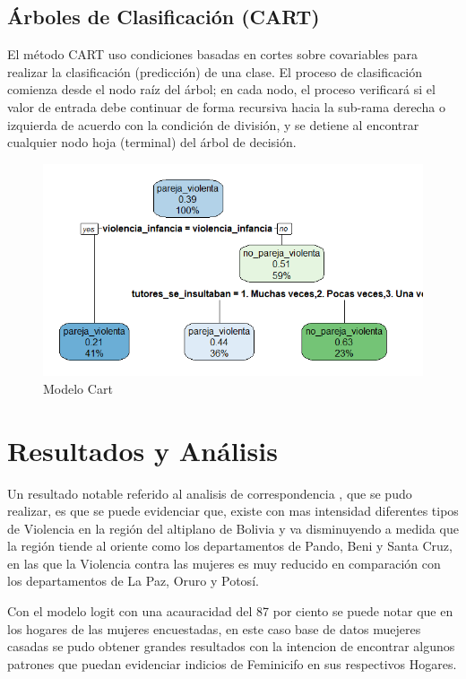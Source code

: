\documentclass[11pt,letter]{article}
\begin{document}
\subsection{Árboles de Clasificación (CART) }
El método CART uso condiciones basadas en cortes sobre covariables para realizar la clasificación (predicción) de una clase. El proceso de clasificación comienza desde el nodo raíz del árbol; en cada nodo, el proceso verificará si el valor de entrada debe continuar de forma recursiva hacia la sub-rama derecha o izquierda de acuerdo con la condición de división, y se detiene al encontrar cualquier nodo hoja (terminal) del árbol de decisión.

\begin{figure}[!htp]
    \centering
    \includegraphics[scale=0.8]{cart.png}
    \caption{Modelo Cart}
    \label{f1_cart}
\end{figure}


\section{Resultados y Análisis}


Un resultado notable referido al analisis de correspondencia , que se pudo realizar, es que se puede evidenciar que, existe con mas intensidad diferentes tipos de Violencia en la región del altiplano de Bolivia y va disminuyendo a medida que la región tiende al oriente como los departamentos de Pando, Beni y Santa Cruz, en las que la Violencia contra las mujeres es muy reducido en comparación con los departamentos de La Paz, Oruro y Potosí.

Con el modelo logit con una acauracidad del 87 por ciento se puede notar que en los hogares de las mujeres encuestadas, en este caso base de datos muejeres casadas se pudo obtener grandes resultados con la intencion de encontrar algunos patrones que puedan evidenciar indicios de Feminicifo en sus respectivos Hogares.  
\end{document}
